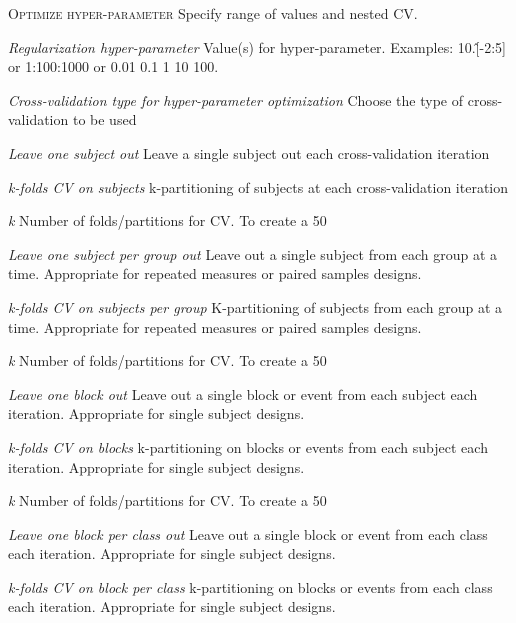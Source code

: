\textsc{Optimize hyper-parameter}
Specify range of values and nested CV.


\textsl{Regularization hyper-parameter}
Value(s) for hyper-parameter. Examples: 10.\^[-2:5] or 1:100:1000 or 0.01 0.1 1 10 100.


\textsl{Cross-validation type for hyper-parameter optimization}
Choose the type of cross-validation to be used


\textit{Leave one subject out}
Leave a single subject out each cross-validation iteration


\textit{k-folds CV on subjects}
k-partitioning of subjects at each cross-validation iteration


\textit{k}
Number of folds/partitions for CV. To create a 50%


\textit{Leave one subject per group out}
Leave out a single subject from each group at a time. Appropriate for repeated measures or paired samples designs.


\textit{k-folds CV on subjects per group}
K-partitioning of subjects from each group at a time. Appropriate for repeated measures or paired samples designs.


\textit{k}
Number of folds/partitions for CV. To create a 50%


\textit{Leave one block out}
Leave out a single block or event from each subject each iteration. Appropriate for single subject designs.


\textit{k-folds CV on blocks}
k-partitioning on blocks or events from each subject each iteration. Appropriate for single subject designs.


\textit{k}
Number of folds/partitions for CV. To create a 50%


\textit{Leave one block per class out}
Leave out a single block or event from each class each iteration. Appropriate for single subject designs.


\textit{k-folds CV on block per class}
k-partitioning on blocks or events from each class each iteration. Appropriate for single subject designs.


